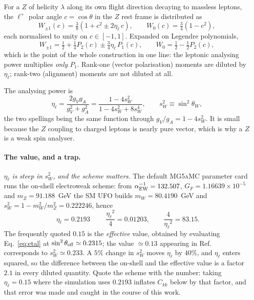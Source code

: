 \documentclass[a4paper,11pt]{article}
\providecommand{\mg}{{\textsc{MG5aMC}}}
\providecommand{\etal}{\ensuremath{\eta_\ell}}          %
\providecommand{\ckk}{\ensuremath{C_{kk}}}              %
\begin{document}
For a $Z$ of helicity $\lambda$ along its own flight direction decaying to
massless leptons, the $\ell^+$ polar angle $c=\cos\theta$ in the $Z$ rest frame
is distributed as
\begin{equation}
  W_{\pm1}(c)=\tfrac38\left(1+c^2\pm2\etal\,c\right),
  \qquad
  W_{0}(c)=\tfrac34\left(1-c^2\right),
  \label{eq:Wlambda}
\end{equation}
each normalised to unity on $c\in[-1,1]$. Expanded on Legendre polynomials,
\begin{equation}
  W_{\pm1}=\tfrac12+\tfrac14P_2(c)\pm\tfrac34\etal\,P_1(c),
  \qquad
  W_{0}=\tfrac12-\tfrac12P_2(c),
  \label{eq:Wlegendre}
\end{equation}
which is the point of the whole construction in one line: the leptonic
analysing power multiplies \emph{only} $P_1$. Rank-one (vector polarisation)
moments are diluted by $\etal$; rank-two (alignment) moments are not diluted at
all.

The analysing power is
\begin{equation}
  \etal=\frac{2g_Vg_A}{g_V^2+g_A^2}
       =\frac{1-4s_W^2}{1-4s_W^2+8s_W^4},
  \qquad s_W^2\equiv\sin^2\theta_W,
  \label{eq:etal}
\end{equation}
the two spellings being the same function through $g_V/g_A=1-4s_W^2$. It is
small because the $Z$ coupling to charged leptons is nearly pure vector, which
is why a $Z$ is a weak spin analyser.

\paragraph{The value, and a trap.} \emph{$\etal$ is steep in $s_W^2$, and the
scheme matters.} The default \mg{} parameter card runs the on-shell electroweak
scheme: from $\alpha_{\rm EW}^{-1}=132.507$, $G_F=1.16639\times10^{-5}$ and
$m_Z=91.188$~GeV the SM UFO builds $m_W=80.4190$~GeV and
$s_W^2=1-m_W^2/m_Z^2=0.222246$, hence
\begin{equation}
  \boxed{\;\etal=0.2193\;}
  \qquad
  \frac{\etal^2}{4}=0.01203,
  \qquad
  \frac{4}{\etal^2}=83.15 .
  \label{eq:etalvalue}
\end{equation}
The frequently quoted $0.15$ is the \emph{effective} value, obtained by
evaluating Eq.~\eqref{eq:etal} at $\sin^2\theta_{\rm eff}\simeq0.2315$; the
value $\simeq0.13$ appearing in Ref.~\cite{Aguilar-Saavedra:2022wam}
corresponds to $s_W^2\simeq0.233$. A $5\%$ change in $s_W^2$ moves $\etal$ by
$40\%$, and $\etal$ enters squared, so the difference between the on-shell and
the effective value is a factor $2.1$ in every diluted quantity. Quote the
scheme with the number: taking $\etal=0.15$ where the simulation uses
$0.2193$ inflates $\ckk$ below by that factor, and that error was made and
caught in the course of this work.
\end{document}

